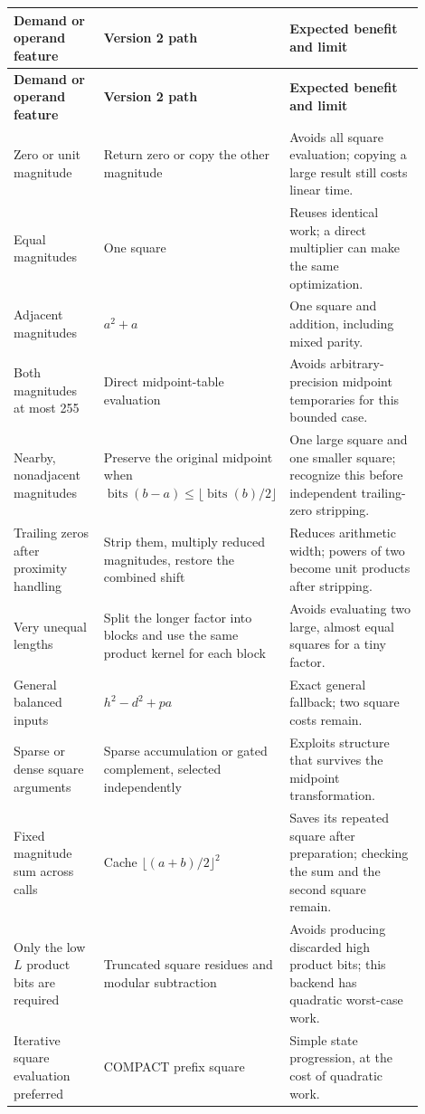 \documentclass[11pt,a4paper]{article}
\begin{document}
\begingroup
\small
\setlength{\tabcolsep}{4pt}
\begin{longtable}{>{\raggedright\arraybackslash}p{0.23\linewidth}>{\raggedright\arraybackslash}p{0.31\linewidth}>{\raggedright\arraybackslash}p{0.36\linewidth}}
\toprule
\textbf{Demand or operand feature} & \textbf{Version 2 path} & \textbf{Expected benefit and limit} \\
\midrule
\endfirsthead
\toprule
\textbf{Demand or operand feature} & \textbf{Version 2 path} & \textbf{Expected benefit and limit} \\
\midrule
\endhead
\bottomrule
\endfoot
Zero or unit magnitude & Return zero or copy the other magnitude & Avoids all square evaluation; copying a large result still costs linear time. \\
Equal magnitudes & One square & Reuses identical work; a direct multiplier can make the same optimization. \\
Adjacent magnitudes & $a^2+a$ & One square and addition, including mixed parity. \\
Both magnitudes at most 255 & Direct midpoint-table evaluation & Avoids arbitrary-precision midpoint temporaries for this bounded case. \\
Nearby, nonadjacent magnitudes & Preserve the original midpoint when $\operatorname{bits}(b-a)\le\lfloor\operatorname{bits}(b)/2\rfloor$ & One large square and one smaller square; recognize this before independent trailing-zero stripping. \\
Trailing zeros after proximity handling & Strip them, multiply reduced magnitudes, restore the combined shift & Reduces arithmetic width; powers of two become unit products after stripping. \\
Very unequal lengths & Split the longer factor into blocks and use the same product kernel for each block & Avoids evaluating two large, almost equal squares for a tiny factor. \\
General balanced inputs & $h^2-d^2+pa$ & Exact general fallback; two square costs remain. \\
Sparse or dense square arguments & Sparse accumulation or gated complement, selected independently & Exploits structure that survives the midpoint transformation. \\
Fixed magnitude sum across calls & Cache $\lfloor(a+b)/2\rfloor^2$ & Saves its repeated square after preparation; checking the sum and the second square remain. \\
Only the low $L$ product bits are required & Truncated square residues and modular subtraction & Avoids producing discarded high product bits; this backend has quadratic worst-case work. \\
Iterative square evaluation preferred & COMPACT prefix square & Simple state progression, at the cost of quadratic work. \\
\end{longtable}
\endgroup
\end{document}
